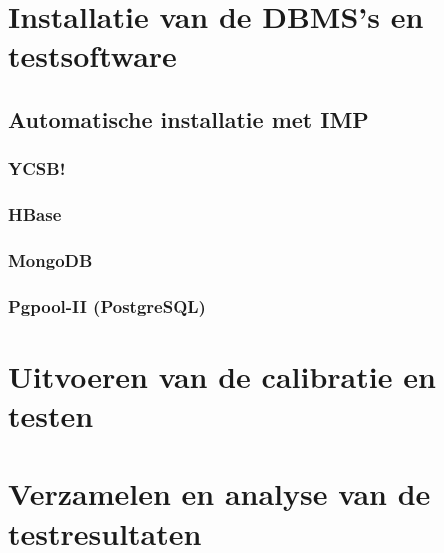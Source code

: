 \section{Installatie van de DBMS's en testsoftware}

\subsection{Automatische installatie met IMP}

\subsubsection{YCSB!}
\subsubsection{HBase}
\subsubsection{MongoDB}
\subsubsection{Pgpool-II (PostgreSQL)}

\section{Uitvoeren van de calibratie en testen}

\section{Verzamelen en analyse van de testresultaten}